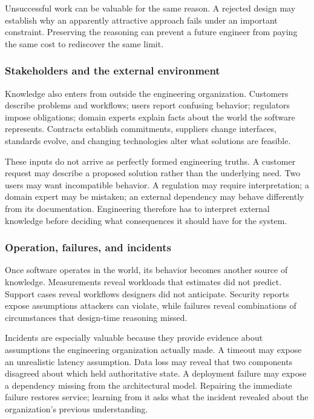 Unsuccessful work can be valuable for the same reason. A rejected design may establish why an
apparently attractive approach fails under an important constraint. Preserving the reasoning can
prevent a future engineer from paying the same cost to rediscover the same limit.

\subsubsection{Stakeholders and the external environment}\label{sec-external-knowledge}

Knowledge also enters from outside the engineering organization. Customers describe problems and
workflows; users report confusing behavior; regulators impose obligations; domain experts explain
facts about the world the software represents. Contracts establish commitments, suppliers change
interfaces, standards evolve, and changing technologies alter what solutions are feasible.

These inputs do not arrive as perfectly formed engineering truths. A customer request may describe a
proposed solution rather than the underlying need. Two users may want incompatible behavior. A
regulation may require interpretation; a domain expert may be mistaken; an external dependency may
behave differently from its documentation. Engineering therefore has to interpret external knowledge
before deciding what consequences it should have for the system.

\subsubsection{Operation, failures, and incidents}\label{sec-operational-knowledge}

Once software operates in the world, its behavior becomes another source of knowledge. Measurements
reveal workloads that estimates did not predict. Support cases reveal workflows designers did not
anticipate. Security reports expose assumptions attackers can violate, while failures reveal
combinations of circumstances that design-time reasoning missed.

Incidents are especially valuable because they provide evidence about assumptions the engineering
organization actually made. A timeout may expose an unrealistic latency assumption. Data loss may
reveal that two components disagreed about which held authoritative state. A deployment failure may
expose a dependency missing from the architectural model. Repairing the immediate failure restores
service; learning from it asks what the incident revealed about the organization's previous
understanding.

